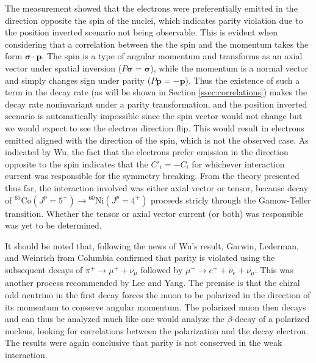 The measurement showed that the electrons were preferentially
emitted in the direction opposite the spin of the nuclei, which indicates parity violation due to
the position inverted scenario not being observable. This is evident when considering that
a correlation between the the spin and the momentum takes the form $\boldsymbol{\sigma \cdot p}$.
The spin is a type of angular momentum and transforms as an axial vector under spatial inversion
($P\boldsymbol{\sigma}=\boldsymbol{\sigma}$), while the momentum is a normal vector and
simply changes sign under parity ($P\boldsymbol{p}=-\boldsymbol{p}$). Thus the existence of
such a term in the decay rate (as will be shown in Section \ref{ssec:correlations}) makes the
decay rate noninvariant under a parity transformation, and the position inverted scenario
is automatically impossible since the spin vector would not change but we would expect to see
the electron direction flip. This would result in electrons emitted aligned with the direction
of the spin, which is not the observed case. As indicated by Wu,
the fact that the electrons prefer emission in the direction opposite
to the spin indicates that the $C'_i=-C_i$ for whichever
interaction current was responsible for the symmetry breaking. From the theory presented thus far,
the interaction involved was either axial vector or tensor, because decay of
$^{60}\mathrm{Co} (J^p=5^+) \rightarrow {^{60}\mathrm{Ni}}(J^p=4^+)$ proceeds stricly through
the Gamow-Teller transition. Whether the tensor or axial vector current (or both) was responsible
was yet to be determined.

It should be noted that, following the news of Wu's result, Garwin, Lederman, and
Weinrich \cite{garwin1957} from Columbia confirmed
that parity is violated using the subsequent decays of $\pi^+ \rightarrow \mu^++\nu_\mu$
followed by $\mu^+ \rightarrow e^+ + \bar{\nu}_e + \nu_\mu$. This was another process
recommended by Lee and Yang. The premise is that the chiral odd neutrino in the first decay
forces the muon to be polarized in the direction of its momentum to conserve angular
momentum. The polarized muon then decays and can thus be analyzed much like one would analyze the
$\beta$-decay of a polarized nucleus, looking for correlations between the polarization and
the decay electron. The results were again conclusive that parity is not conserved in the weak
interaction.

